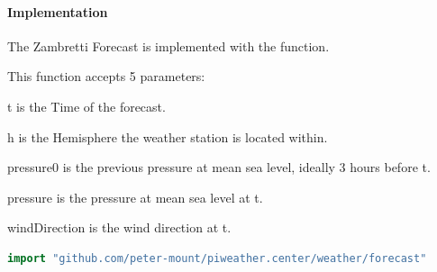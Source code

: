 \paragraph{Implementation}

The Zambretti Forecast is implemented with the
function.

This function accepts 5 parameters:

t is the Time of the forecast.

h is the Hemisphere the weather station is located within.

pressure0 is the previous pressure at mean sea level, ideally 3 hours before t.

pressure is the pressure at mean sea level at t.

windDirection is the wind direction at t.

\begin{lstlisting}[caption={Import Zambretti Forecaster},language=Go]
import "github.com/peter-mount/piweather.center/weather/forecast"
\end{lstlisting}
